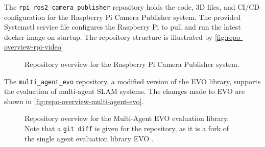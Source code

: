 The \texttt{rpi\_ros2\_camera\_publisher} repository holds the code, 3D files, and CI/CD configuration for the Raspberry Pi Camera Publisher system. The provided Systemctl service file configures the Raspberry Pi to pull and run the latest docker image on startup. The repository structure is illustrated by \autoref{fig:repo-overview-rpi-video}

\begin{figure}[h]
    \centering
    \captionsetup{justification=raggedright,singlelinecheck=false, skip=0.5em}
    \begin{minipage}[t]{\linewidth}
        \footnotesize
        \setlength{\DTbaselineskip}{12pt}
    \end{minipage}
    \caption{Repository overview for the Raspberry Pi Camera Publisher system.}
    \label{fig:repo-overview-rpi-video}
\end{figure}

The \texttt{multi\_agent\_evo} repository, a modified version of the EVO library, supports the evaluation of multi-agent SLAM systems. The changes made to EVO are shown in \autoref{fig:repo-overview-multi-agent-evo}.

\begin{figure}[h]
    \centering
    \captionsetup{skip=0.5em}
    \begin{minipage}[t]{\linewidth}
        \footnotesize
        \setlength{\DTbaselineskip}{12pt}
    \end{minipage}
    \caption{Repository overview for the Multi-Agent EVO evaluation library. \captionbreak Note that a \texttt{git diff} is given for the repository, as it is a fork of the single agent evaluation library EVO \autocite{grupp2017evo}.}
    \label{fig:repo-overview-multi-agent-evo}
\end{figure}


